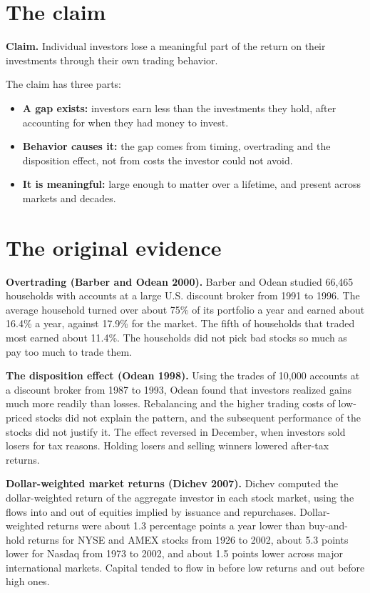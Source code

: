 \section{The claim}
\label{sec:24-claim}

\begin{callout}
\textbf{Claim.} Individual investors lose a meaningful part of the return on their investments through their own trading behavior.
\end{callout}

The claim has three parts:

\begin{itemize}
  \item \textbf{A gap exists:} investors earn less than the investments they hold, after accounting for when they had money to invest.
  \item \textbf{Behavior causes it:} the gap comes from timing, overtrading and the disposition effect, not from costs the investor could not avoid.
  \item \textbf{It is meaningful:} large enough to matter over a lifetime, and present across markets and decades.
\end{itemize}

\section{The original evidence}
\label{sec:24-evidence}

\textbf{Overtrading (Barber and Odean 2000).} Barber and Odean studied 66,465 households with accounts at a large U.S. discount broker from 1991 to 1996. The average household turned over about 75\% of its portfolio a year and earned about 16.4\% a year, against 17.9\% for the market. The fifth of households that traded most earned about 11.4\%. The households did not pick bad stocks so much as pay too much to trade them.

\textbf{The disposition effect (Odean 1998).} Using the trades of 10,000 accounts at a discount broker from 1987 to 1993, Odean found that investors realized gains much more readily than losses. Rebalancing and the higher trading costs of low-priced stocks did not explain the pattern, and the subsequent performance of the stocks did not justify it. The effect reversed in December, when investors sold losers for tax reasons. Holding losers and selling winners lowered after-tax returns.

\textbf{Dollar-weighted market returns (Dichev 2007).} Dichev computed the dollar-weighted return of the aggregate investor in each stock market, using the flows into and out of equities implied by issuance and repurchases. Dollar-weighted returns were about 1.3 percentage points a year lower than buy-and-hold returns for NYSE and AMEX stocks from 1926 to 2002, about 5.3 points lower for Nasdaq from 1973 to 2002, and about 1.5 points lower across major international markets. Capital tended to flow in before low returns and out before high ones.

